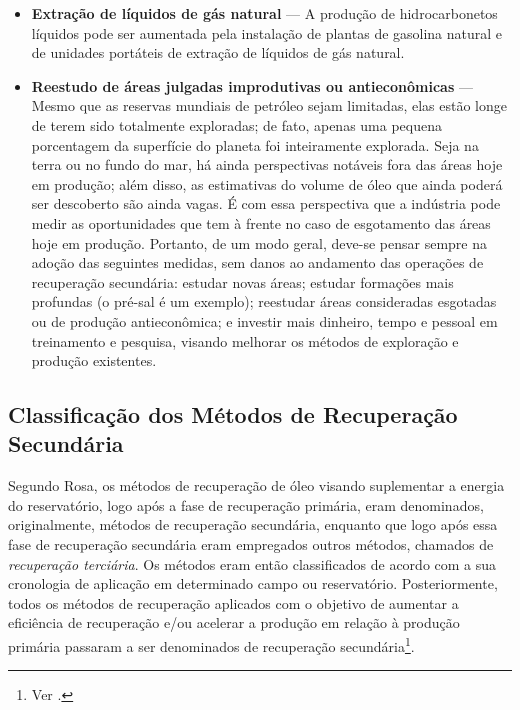 \begin{itemize}
\item \textbf{Extra\c{c}\~{a}o de l\'{i}quidos de g\'{a}s natural} --- A produ\c{c}\~{a}o de hidrocarbonetos l\'{i}quidos pode ser aumentada pela instala\c{c}\~{a}o de plantas de gasolina natural e de unidades port\'{a}teis de extra\c{c}\~{a}o de l\'{i}quidos de g\'{a}s natural.
\item \textbf{Reestudo de \'{a}reas julgadas improdutivas ou antiecon\^{o}micas} --- Mesmo que as reservas mundiais de petr\'{o}leo sejam limitadas, elas est\~{a}o longe de terem sido totalmente exploradas; de fato, apenas uma pequena porcentagem da superf\'{i}cie do planeta foi inteiramente explorada. Seja na terra ou no fundo do mar, h\'{a} ainda perspectivas not\'{a}veis fora das \'{a}reas hoje em produ\c{c}\~{a}o; al\'{e}m disso, as estimativas do volume de \'{o}leo que ainda poder\'{a} ser descoberto s\~{a}o ainda vagas. \'{E} com essa perspectiva que a ind\'{u}stria pode medir as oportunidades que tem \`{a} frente no caso de esgotamento das \'{a}reas hoje em produ\c{c}\~{a}o. Portanto, de um modo geral, deve-se pensar sempre na ado\c{c}\~{a}o das seguintes medidas, sem danos ao andamento das opera\c{c}\~{o}es de recupera\c{c}\~{a}o secund\'{a}ria: estudar novas \'{a}reas; estudar forma\c{c}\~{o}es mais profundas (o pr\'{e}-sal \'{e} um exemplo); reestudar \'{a}reas consideradas esgotadas ou de produ\c{c}\~{a}o antiecon\^{o}mica; e investir mais dinheiro, tempo e pessoal em treinamento e pesquisa, visando melhorar os m\'{e}todos de explora\c{c}\~{a}o e produ\c{c}\~{a}o existentes.
\end{itemize}

\subsection{Classifica\c{c}\~{a}o dos M\'{e}todos de Recupera\c{c}\~{a}o Secund\'{a}ria}
Segundo Rosa, os m\'{e}todos de recupera\c{c}\~{a}o de \'{o}leo visando suplementar a energia do reservat\'{o}rio, logo ap\'{o}s a fase de recupera\c{c}\~{a}o prim\'{a}ria, eram denominados, originalmente, m\'{e}todos de recupera\c{c}\~{a}o secund\'{a}ria, enquanto que logo ap\'{o}s essa fase de recupera\c{c}\~{a}o secund\'{a}ria eram empregados outros m\'{e}todos, chamados de \textit{recupera\c{c}\~{a}o terci\'{a}ria}. Os m\'{e}todos eram ent\~{a}o classificados de acordo com a sua cronologia de aplica\c{c}\~{a}o em determinado campo ou reservat\'{o}rio. Posteriormente, todos os m\'{e}todos de recupera\c{c}\~{a}o aplicados com o objetivo de aumentar a efici\^{e}ncia de recupera\c{c}\~{a}o e/ou acelerar a produ\c{c}\~{a}o em rela\c{c}\~{a}o \`{a} produ\c{c}\~{a}o prim\'{a}ria passaram a ser denominados de recupera\c{c}\~{a}o secund\'{a}ria\footnote{Ver \cite[p. 564]{engres}.}.

